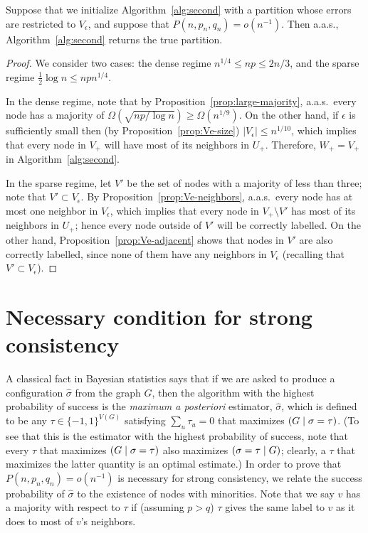 \documentclass[EJP]{ejpecp}
\newcommand{\1}[1]{\mathbbm{1}_{\{#1\}}}
\let\Pr\relax
\DeclareMathOperator{\Pr}{Pr}
\begin{document}
\begin{proposition}\label{prop:alg-works}
 Suppose that we initialize Algorithm~\ref{alg:second} with a partition whose
 errors are restricted to $V_\epsilon$, and suppose that $P(n, p_n, q_n) = o(n^{-1})$.
 Then a.a.s., Algorithm~\ref{alg:second} returns the true partition.
\end{proposition}

\begin{proof}
  We consider two cases: the dense regime $n^{1/4} \le np \le 2n/3$, and the sparse
 regime $\frac 12 \log n \le np n^{1/4}$.

 In the dense regime, note that by Proposition~\ref{prop:large-majority},
 a.a.s.\ every node has a majority of $\Omega(\sqrt{np/\log n}) \ge \Omega(n^{1/9})$.
 On the other hand, if $\epsilon$ is sufficiently small then
 (by Proposition~\ref{prop:Ve-size}) $|V_\epsilon| \le n^{1/10}$, which implies that
 every node in $V_+$ will have most of its neighbors in $U_+$.
 Therefore, $W_+ = V_+$ in Algorithm~\ref{alg:second}.

 In the sparse regime, let $V'$ be the set
 of nodes with a majority of less than three; note that $V' \subset V_\epsilon$.
 By Proposition~\ref{prop:Ve-neighbors},
 a.a.s.\ every node has at most one neighbor in $V_\epsilon$, which
 implies that every node in $V_+ \setminus V'$ has most of its neighbors in $U_+$;
 hence every node outside of $V'$ will be correctly labelled.
 On the other hand,
 Proposition~\ref{prop:Ve-adjacent} shows that nodes in $V'$ are also correctly
 labelled, since none of them have any neighbors in $V_\epsilon$ (recalling
 that $V' \subset V_\epsilon$).
\end{proof}

\section{Necessary condition for strong consistency}

\label{sec:necessary-strong}

A classical fact in Bayesian statistics says that if we are asked to produce
a configuration $\hat \sigma$ from the graph $G$, then the algorithm
with the highest probability of success is the \emph{maximum
a posteriori} estimator, $\hat \sigma$, which is defined to be
any $\tau \in \{-1, 1\}^{V(G)}$ satisfying $\sum_u \tau_u = 0$
that maximizes $\Pr(G \mid \sigma = \tau)$.
(To see that this is the estimator with the highest probability of success,
note that every $\tau$ that maximizes $\Pr(G \mid \sigma = \tau)$ 
also maximizes $\Pr(\sigma = \tau \mid G)$; clearly, a $\tau$ that
maximizes the latter quantity is an optimal estimate.)
In order to prove that $P(n, p_n, q_n) = o(n^{-1})$ is necessary for
strong consistency, we relate the success probability of
$\hat \sigma$ to the existence of nodes with minorities.
Note that we say $v$ has a majority with respect to
$\tau$ if (assuming $p > q$) $\tau$ gives the same label to $v$ as
it does to most of $v$'s neighbors.
\end{document}
